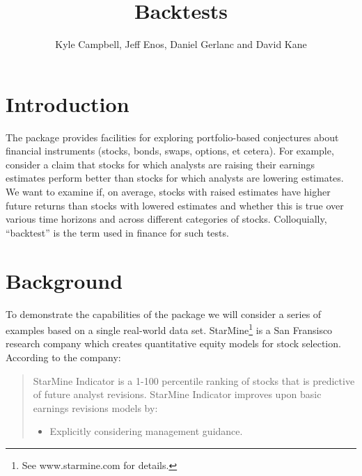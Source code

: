 \documentclass[a4paper]{report}
\begin{document}
\begin{article}
\title{Backtests}
\author{Kyle Campbell, Jeff Enos, Daniel Gerlanc and David Kane}



\maketitle


\section*{Introduction}

The  package provides facilities for exploring
portfolio-based conjectures about financial instruments (stocks, bonds,
swaps, options, et cetera).  For example, consider a claim that stocks
for which analysts are raising their earnings estimates perform better
than stocks for which analysts are lowering estimates.  We want to
examine if, on average, stocks with raised estimates have higher
future returns than stocks with lowered estimates and whether this is
true over various time horizons and across different categories of
stocks.  Colloquially, ``backtest'' is the term used in finance for
such tests.

\section*{Background}
To demonstrate the capabilities of the  package we will
consider a series of examples based on a single real-world data set.
StarMine\footnote{See www.starmine.com for details.} is a San
Fransisco research company which creates quantitative equity models
for stock selection.  According to the company:


\small

\begin{quote}
  StarMine Indicator is a 1-100 percentile ranking of stocks that is
  predictive of future analyst revisions. StarMine Indicator improves
  upon basic earnings revisions models by:

\begin{itemize}
\item Explicitly considering management guidance.
  

\end{itemize}
\end{quote}
\end{article}
\end{document}
